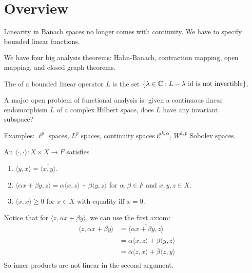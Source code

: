\documentclass[12pt,class=article,crop=false]{standalone}
\begin{document}
\section{Overview}
\begin{remark}
Linearity in Banach spaces no longer comes with continuity. We have to specify bounded linear functions.
\end{remark}

We have four big analysis theorems: Hahn-Banach, contraction mapping, open mapping, and closed graph theorems.

\begin{defn}
	The  of a bounded linear operator $ L$ is the set  $ \{\lambda \in \mathbb{C}: L- \lambda \text{ id is not invertible} \} $.
\end{defn}

A major open problem of functional analysis is: given a continuous linear endomorphism $ L$ of a complex Hilbert space, does $ L$ have any invariant subspace?

Examples: $ \ell^{p}$ spaces, $ L^{p}$ spaces, continuity spaces $ \mathcal{ C}^{k, \alpha}$, $ W^{k,p}$ Sobolev spaces.

\begin{defn}
An  $ \langle \cdot , \cdot  \rangle: X \times X \to F$ satisfies
\begin{enumerate}[label=(\arabic*)]
	\item $ \langle y,x \rangle = \overline{ \langle x,y \rangle}$.
	\item $ \langle \alpha x+ \beta y,z \rangle = \alpha \langle x,z \rangle+ \beta \langle y,z \rangle$ for $ \alpha, \beta \in F$ and $ x,y,z \in X$.
	\item $ \langle x,x \rangle \geq 0$ for $ x \in X$ with equality iff $ x = 0$.
\end{enumerate}
\end{defn}
Notice that for $ \langle z, \alpha x + \beta y \rangle$, we can use the first axiom:
\begin{align*}
	\langle z, \alpha x + \beta y \rangle &= \overline{ \langle \alpha x + \beta y, z \rangle} \\
	&= \overline{ \alpha \langle x,z \rangle + \beta \langle y,z \rangle} \\
	&= \overline{ \alpha} \langle z,x \rangle + \overline{ \beta} \langle z,y \rangle \\
\end{align*}
So inner products are not linear in the second argument.
\end{document}
